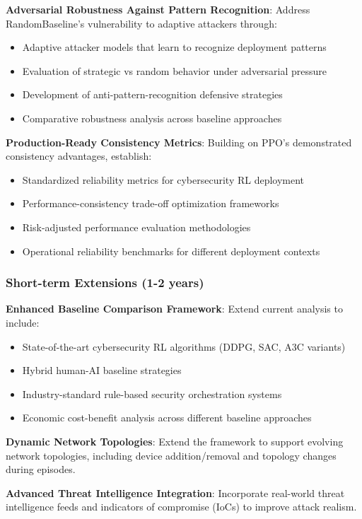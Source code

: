 \documentclass[12pt,twoside]{article}
\theoremstyle{definition}
\theoremstyle{plain}
\begin{document}
\textbf{Adversarial Robustness Against Pattern Recognition}: Address RandomBaseline's vulnerability to adaptive attackers through:
\begin{itemize}
\item Adaptive attacker models that learn to recognize deployment patterns
\item Evaluation of strategic vs random behavior under adversarial pressure
\item Development of anti-pattern-recognition defensive strategies
\item Comparative robustness analysis across baseline approaches
\end{itemize}

\textbf{Production-Ready Consistency Metrics}: Building on PPO's demonstrated consistency advantages, establish:
\begin{itemize}
\item Standardized reliability metrics for cybersecurity RL deployment
\item Performance-consistency trade-off optimization frameworks
\item Risk-adjusted performance evaluation methodologies
\item Operational reliability benchmarks for different deployment contexts
\end{itemize}

\subsubsection{Short-term Extensions (1-2 years)}

\textbf{Enhanced Baseline Comparison Framework}: Extend current analysis to include:
\begin{itemize}
\item State-of-the-art cybersecurity RL algorithms (DDPG, SAC, A3C variants)
\item Hybrid human-AI baseline strategies
\item Industry-standard rule-based security orchestration systems
\item Economic cost-benefit analysis across different baseline approaches
\end{itemize}

\textbf{Dynamic Network Topologies}: Extend the framework to support evolving network topologies, including device addition/removal and topology changes during episodes.

\textbf{Advanced Threat Intelligence Integration}: Incorporate real-world threat intelligence feeds and indicators of compromise (IoCs) to improve attack realism.
\end{document}
